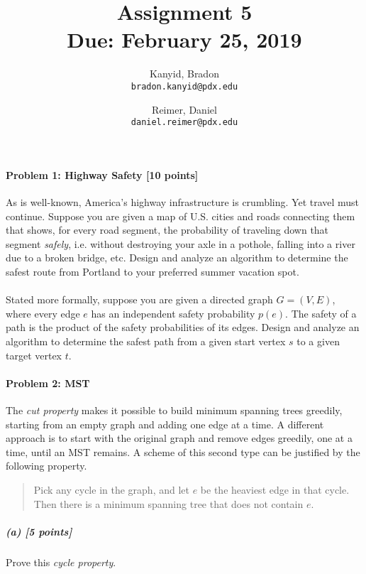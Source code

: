 \documentclass[11pt]{article}
\title{\bf Assignment 5 \\[2ex]
\rm\normalsize Due: February 25, 2019}
\date{}
\author{
  Kanyid, Bradon\\
  \texttt{bradon.kanyid@pdx.edu}
  \and
  Reimer, Daniel\\
  \texttt{daniel.reimer@pdx.edu}
}
\begin{document}
\maketitle

\begin{center}
\end{center}

\paragraph{Problem 1: Highway Safety [10 points]}
As is well-known, America’s highway infrastructure is crumbling. Yet travel must continue.
Suppose you are given a map of U.S. cities and roads connecting them that shows, for every road
segment, the probability of traveling down that segment {\em safely}, i.e. without destroying your axle
in a pothole, falling into a river due to a broken bridge, etc. Design and analyze an algorithm to
determine the safest route from Portland to your preferred summer vacation spot.

\paragraph{}
Stated more formally, suppose you are given a directed graph $G = (V,E)$, where every edge $e$ has an independent
safety probability $p(e)$. The safety of a path is the product of the safety probabilities
of its edges. Design and analyze an algorithm to determine the safest path from a given start vertex
$s$ to a given target vertex $t$.



\paragraph{Problem 2: MST}
The {\em cut property} makes it possible to build minimum
spanning trees greedily, starting from an empty graph and adding one edge at a time. A different approach
is to start with the original graph and remove edges greedily, one at a time, until an MST remains. A
scheme of this second type can be justified by the following property.
\begin{quote}
Pick any cycle in the graph, and let $e$ be the heaviest edge in that cycle. Then there is a
minimum spanning tree that does not contain $e$.
\end{quote}
\subparagraph{(a) [5 points]}
Prove this {\em cycle property}.
\end{document}
